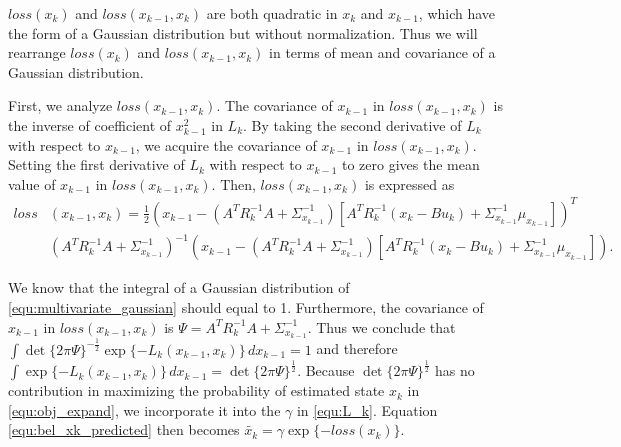 $loss(x_k)$ and $loss(x_{k-1},x_k)$ are both quadratic in $x_k$ and $x_{k-1}$, which have the form of a Gaussian distribution but without normalization. 
Thus we will rearrange $loss(x_k)$ and $loss(x_{k-1},x_k)$ in terms of mean and covariance of a Gaussian distribution. 

First, we analyze $loss(x_{k-1},x_k)$. 
The covariance of $x_{k-1}$ in $loss(x_{k-1},x_k)$ is the inverse of coefficient of $x_{k-1}^2$ in $L_k$. 
By taking the second derivative of $L_k$ with respect to $x_{k-1}$, we acquire the covariance of $x_{k-1}$ in $loss(x_{k-1},x_k)$. 
Setting the first derivative of $L_k$ with respect to $x_{k-1}$ to zero gives the mean value of $x_{k-1}$ in $loss(x_{k-1},x_k)$. Then, $loss(x_{k-1},x_k)$ is expressed as 
\begin{equation}
	\begin{split}
		\mathit{loss}&(x_{k-1},x_k) =  \frac{1}{2}( x_{k-1} - (A^TR_k^{-1}A+\Sigma_{x_{k-1}}^{-1})	[A^TR_k^{-1}(x_k-Bu_k)+\Sigma_{x_{k-1}}^{-1}\mu_{x_{k-1}}] )^T \\ & (A^TR_k^{-1}A+\Sigma_{x_{k-1}}^{-1})^{-1} 
		(x_{k-1} - (A^TR_k^{-1}A+\Sigma_{x_{k-1}}^{-1})	[A^TR_k^{-1}(x_k-Bu_k)+\Sigma_{x_{k-1}}^{-1}\mu_{x_{k-1}}] ).
	\end{split}
\end{equation}

We know that the integral of a Gaussian distribution of \cref{equ:multivariate_gaussian} should equal to 1. 
Furthermore, the covariance of $x_{k-1}$ in $loss(x_{k-1},x_k)$ is $\Psi = A^TR_k^{-1}A+\Sigma_{x_{k-1}}^{-1}$. Thus we conclude that
$
\int \det\{2\pi \Psi \} ^{-\frac{1}{2} }  \exp\{-L_k(x_{k-1},x_k) \} \,dx_{k-1} = 1
$
and therefore
$
\int  \exp\{-L_k(x_{k-1},x_k) \} \,dx_{k-1} = \det\{2\pi \Psi \} ^{\frac{1}{2} }.
$
Because $\det\{2\pi \Psi \} ^{\frac{1}{2}}$ has no contribution in maximizing the probability of estimated state $x_k$ in \cref{equ:obj_expand}, we incorporate it into the $\gamma$ in \cref{equ:L_k}. Equation \cref{equ:bel_xk_predicted} then becomes 
$
\tilde{x_{k}} = \gamma \exp\{-loss(x_k)\}.
$


